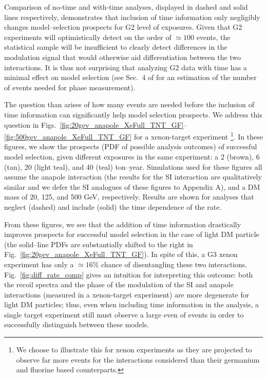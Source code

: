 \documentclass[11pt]{article}
\newcommand{\Fig}[1]{Fig.~\ref{#1}} \newcommand{\Figs}[2]{Figs.~\ref{#1} and \ref{#2}}
\begin{document}
Comparison of no-time and with-time analyses, displayed in dashed and solid lines respectively, demonstrates that inclusion of time information only negligibly changes model--selection prospects for G2 level of exposures. Given that G2 experiments will optimistically detect on the order of $\simeq 100$ events, the statistical sample will be insufficient to clearly detect differences in the modulation signal that would otherwise aid differentiation between the two interactions. It is thus not surprising that analyzing G2 data with time has a minimal effect on model selection (see \eg Sec.~4 of \cite{DelNobile:2015nua} for an estimation of the number of events needed for phase measurement).

The question than arises of how many events are needed before the inclusion of time information can significantly help model selection prospects. We address this question in Figs.~\ref{fig:20gev_anapole_XeFull_TNT_GF}--\ref{fig:500gev_anapole_XeFull_TNT_GF} for a xenon-target experiment \footnote{We choose to illustrate this for xenon experiments as they are projected to observe far more events for the interactions considered than their germanium and fluorine based counterparts.}. In these figures, we show the prospects (PDF of possible analysis outcomes) of successful model selection, given different exposures in the same experiment: a 2 (brown), 6 (tan), 20 (light teal), and 40 (teal) ton--year. Simulations used for these figures all assume the anapole interaction (the results for the SI interaction are qualitatively similar and we defer the SI analogues of these figures to Appendix A), and a DM mass of 20, 125, and 500 GeV, respectively. Results are shown for analyses that neglect (dashed) and include (solid) the time dependence of the rate. 

From these figures, we see that the addition of time information drastically improves prospects for successful model selection in the case of light DM particle (the solid--line PDFs are substantially shifted to the right in \Fig{fig:20gev_anapole_XeFull_TNT_GF}). In spite of this, a G3 xenon experiment has only a $\simeq 16\%$ chance of disentangling these two interactions. \Fig{fig:diff_rate_comp} gives an intuition for interpreting this outcome: both the recoil spectra and the phase of the modulation of the SI and anapole interactions (measured in a xenon-target experiment) are more degenerate for light DM particles; thus, even when including time information in the analysis, a single target experiment still must observe a large even of events in order to successfully distinguish between these models.
\end{document}
